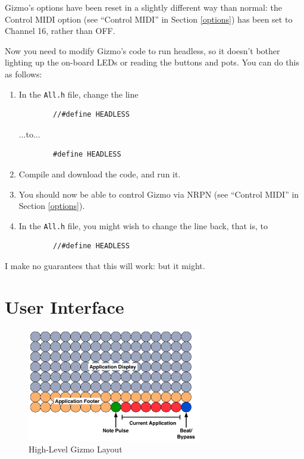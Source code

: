 \documentclass{article}
\begin{document}
Gizmo's options have been reset in a slightly different way than normal: the Control MIDI option (see ``Control MIDI'' in Section \ref{options}) has been set to Channel 16, rather than OFF.

Now you need to modify Gizmo's code to run headless, so it doesn't bother lighting up the on-board LEDs or reading the buttons and pots.   You can do this as follows:

\begin{enumerate}
\item In the \texttt{All.h} file, change the line 
\begin{verbatim}
        //#define HEADLESS
\end{verbatim}
...to...
\begin{verbatim}
        #define HEADLESS
\end{verbatim}
\item Compile and download the code, and run it.
\item You should now be able to control Gizmo via NRPN (see ``Control MIDI'' in Section \ref{options}).
\item In the \texttt{All.h} file, you might wish to change the line back, that is, to 
\begin{verbatim}
        //#define HEADLESS
\end{verbatim}

\end{enumerate}

I make no guarantees that this will work: but it might.

\section{User Interface}

\begin{figure}
\vspace{-1.5em}\includegraphics[width=3in]{OverallLayout.pdf}
\vspace{-2em}\caption{\small High-Level Gizmo Layout}
\label{HighLevelGizmoLayout}
\end{figure}
\end{document}
